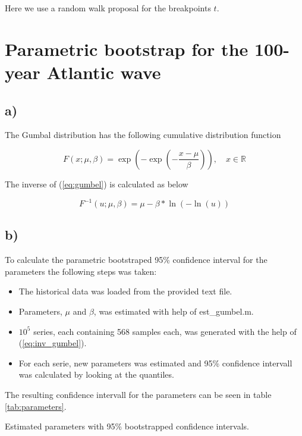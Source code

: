 \documentclass[a4paper]{article}
\begin{document}
Here we use a random walk proposal for the breakpoints $t$.

\newpage

\section{Parametric bootstrap for the 100-year Atlantic wave}

\subsection*{a)}

The Gumbal distribution has the following cumulative distribution function

\begin{equation}
    F(x; \mu, \beta) = \exp\left(-\exp\left(-\frac{x-\mu}{\beta}\right)\right), \quad x \in \mathbb{R}
    \label{eq:gumbel}
\end{equation}

The inverse of (\ref{eq:gumbel}) is calculated as below

\begin{equation}
    F^{-1}(u; \mu, \beta) = \mu - \beta*\ln(-\ln(u))
    \label{eq:inv_gumbel}
\end{equation}

\subsection*{b)}

To calculate the parametric bootstraped 95\% confidence interval for the parameters the following steps was taken:

\begin{itemize}
    \item The historical data was loaded from the provided text file.
    \item Parameters, $\mu$ and $\beta$, was estimated with help of est\_gumbel.m.
    \item $10^5$ series, each containing 568 samples each, was generated with the help of (\ref{eq:inv_gumbel}).
    \item For each serie, new parameters was estimated and 95\% confidence intervall was calculated by looking at the quantiles.
\end{itemize}

The resulting confidence intervall for the parameters can be seen in table \ref{tab:parameters}.

\begin{table}[H]
    \centering
    \caption{Estimated parameters with 95\% bootstrapped confidence intervals.}
    \label{tab:parameters}
    
\end{table}
\end{document}
